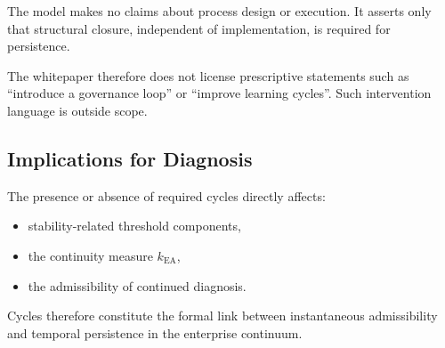 The model makes no claims about process design or execution.
It asserts only that structural closure, independent of implementation,
is required for persistence.

The whitepaper therefore does not license prescriptive statements such
as ``introduce a governance loop'' or ``improve learning cycles''.
Such intervention language is outside scope.

\subsection{Implications for Diagnosis}

The presence or absence of required cycles directly affects:
\begin{itemize}
  \item stability-related threshold components,
  \item the continuity measure $k_{\mathrm{EA}}$,
  \item the admissibility of continued diagnosis.
\end{itemize}

Cycles therefore constitute the formal link between instantaneous
admissibility and temporal persistence in the enterprise continuum.

